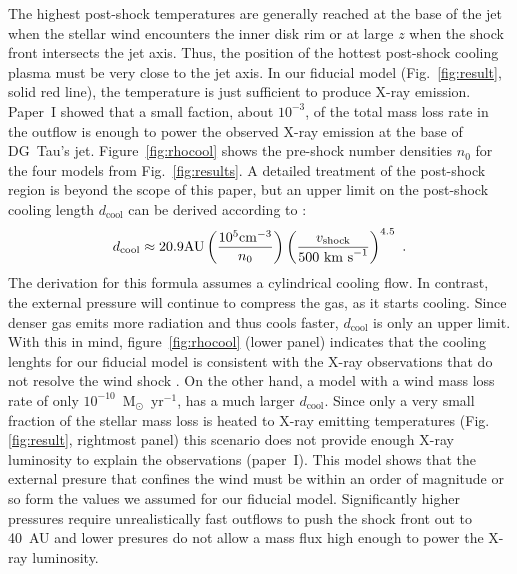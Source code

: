 The highest post-shock temperatures are generally reached at the base of the jet when the stellar wind encounters the inner disk rim or at large $z$ when the shock front intersects the jet axis. Thus, the position of the hottest post-shock cooling plasma must be very close to the jet axis. In our fiducial model (Fig.~\ref{fig:result}, solid red line), the temperature is just sufficient to produce X-ray emission. Paper~I showed that a small faction, about $10^{-3}$, of the total mass loss rate in the outflow is enough to power the observed X-ray emission at the base of DG~Tau's jet. Figure~\ref{fig:rhocool} shows the pre-shock number densities $n_0$ for the four models from Fig.~\ref{fig:results}. A detailed treatment of the post-shock region is beyond the scope of this paper, but an upper limit on the post-shock cooling length $d_{\mathrm{cool}}$ can be derived according to \citet{2002ApJ...576L.149R}:
\begin{equation}
d_{\mathrm{cool}} \approx 20.9 \mathrm{ AU}
    \left(\frac{10^5\mathrm{ cm}^{-3}}{n_0}\right)
    \left(\frac{v_{\mathrm{shock}}}{500\textnormal{ km s}^{-1}}\right)^{4.5}\ .
\end{equation}
The derivation for this formula assumes a cylindrical cooling flow. In contrast, the external pressure will continue to compress the gas, as it starts cooling. Since denser gas emits more radiation and thus cools faster, $d_{\mathrm{cool}}$ is only an upper limit. With this in mind, figure~\ref{fig:rhocool} (lower panel) indicates that the cooling lenghts for our fiducial model is consistent with the X-ray observations that do not resolve the wind shock \citep{2008A&A...488L..13S}. On the other hand, a model with a wind mass loss rate of only $10^{-10}$~M$_{\odot}$~yr$^{-1}$, has a much larger $d_{\mathrm{cool}}$. Since only a very small fraction of the stellar mass loss is heated to X-ray emitting temperatures (Fig.\ref{fig:result}, rightmost panel) this scenario does not provide enough X-ray luminosity to explain the observations (paper~I). This model shows that the external presure that confines the wind must be within an order of magnitude or so form the values we assumed for our fiducial model. Significantly higher pressures require unrealistically fast outflows to push the shock front out to 40~AU and lower presures do not allow a mass flux high enough to power the X-ray luminosity.

